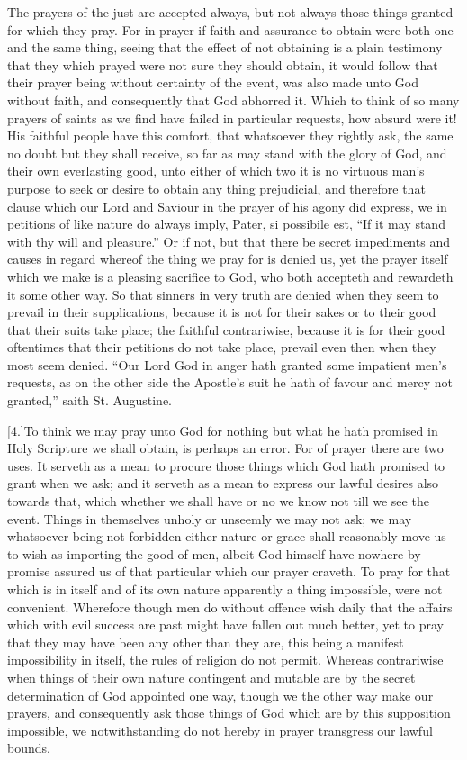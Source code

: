 The prayers of the just are accepted always, but not always those things granted for which they pray. For in prayer if faith and assurance to obtain were both one and the same thing, seeing that the effect of not obtaining is a plain testimony that they which prayed were not sure they should  obtain, it would follow that their prayer being without certainty of the event,
 was also made unto God without faith, and consequently that God abhorred it. Which to think of so many prayers of saints as we find have failed in particular requests, how absurd were it! His faithful people have this comfort, that whatsoever they rightly ask, the same no doubt but they shall receive, so far as may stand with the glory of God, and their own everlasting good, unto either of which two it is no virtuous man’s purpose to seek or desire to obtain any thing prejudicial, and therefore that clause which our Lord and Saviour in the prayer of his agony did express, we in petitions of like nature do always imply, Pater, si possibile est, “If it may stand with thy will and pleasure.” Or if not, but that there be secret impediments and causes in regard whereof the thing we pray for is denied us, yet the prayer itself which we make is a pleasing sacrifice to God, who both accepteth and rewardeth it some other way. So that sinners in very truth are denied when they seem to prevail in their supplications, because it is not for their sakes or to their good that their suits take place; the faithful contrariwise, because it is for their good oftentimes that their petitions do not take place, prevail even then when they most seem denied. “Our Lord God in anger hath granted some impatient men’s requests, as on the other side the Apostle’s suit he hath of favour and mercy not granted,” saith St. Augustine.

[4.]To think we may pray unto God for nothing but what he hath promised in Holy Scripture we shall obtain, is perhaps an error. For of prayer there are two uses. It serveth as a mean to procure those things which God hath promised to grant when we ask; and it serveth as a mean to express our lawful desires also towards that, which whether we shall have or no we know not till we see the event. Things in themselves unholy or unseemly we may not ask; we may whatsoever being not forbidden either nature or grace shall reasonably move us to wish as importing the good of men, albeit God himself have nowhere by promise  assured us of that particular which our prayer craveth.
 To pray for that which is in itself and of its own nature apparently a thing impossible, were not convenient. Wherefore though men do without offence wish daily that the affairs which with evil success are past might have fallen out much better, yet to pray that they may have been any other than they are, this being a manifest impossibility in itself, the rules of religion do not permit. Whereas contrariwise when things of their own nature contingent and mutable are by the secret determination of God appointed one way, though we the other way make our prayers, and consequently ask those things of God which are by this supposition impossible, we notwithstanding do not hereby in prayer transgress our lawful bounds.

